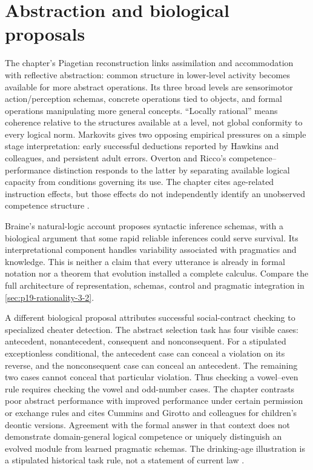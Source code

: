 \section{Abstraction and biological proposals}
\label{sec:p19-r151-biological}

The chapter's Piagetian reconstruction links assimilation and accommodation
with reflective abstraction: common structure in lower-level activity becomes
available for more abstract operations. Its three broad levels are sensorimotor
action/perception schemas, concrete operations tied to objects, and formal
operations manipulating more general concepts. ``Locally rational'' means
coherence relative to the structures available at a level, not global conformity
to every logical norm. Markovits gives two opposing empirical pressures on a
simple stage interpretation: early successful deductions reported by Hawkins
and colleagues, and persistent adult errors. Overton and Ricco's
competence--performance distinction responds to the latter by separating
available logical capacity from conditions governing its use. The chapter
cites age-related instruction effects, but those effects do not independently
identify an unobserved competence structure
\cite[pp.~781--782]{Markovits2021DevelopmentRationality}.

Braine's natural-logic account proposes syntactic inference schemas, with a
biological argument that some rapid reliable inferences could serve survival.
Its interpretational component handles variability associated with pragmatics
and knowledge. This is neither a claim that every utterance is already in
formal notation nor a theorem that evolution installed a complete calculus.
Compare the full architecture of representation, schemas, control and pragmatic
integration in \cref{sec:p19-rationality-3-2}.

A different biological proposal attributes successful social-contract checking
to specialized cheater detection. The abstract selection task has four visible
cases: antecedent, nonantecedent, consequent and nonconsequent. For a stipulated
exceptionless conditional, the antecedent case can conceal a violation on its
reverse, and the nonconsequent case can conceal an antecedent. The remaining
two cases cannot conceal that particular violation. Thus checking a vowel--even
rule requires checking the vowel and odd-number cases. The chapter contrasts
poor abstract performance with improved performance under certain permission
or exchange rules and cites Cummins and Girotto and colleagues for children's
deontic versions. Agreement with the formal answer in that context does not
demonstrate domain-general logical competence or uniquely distinguish an evolved
module from learned pragmatic schemas. The drinking-age illustration is a
stipulated historical task rule, not a statement of current law
\cite[pp.~782--783]{Markovits2021DevelopmentRationality}.

